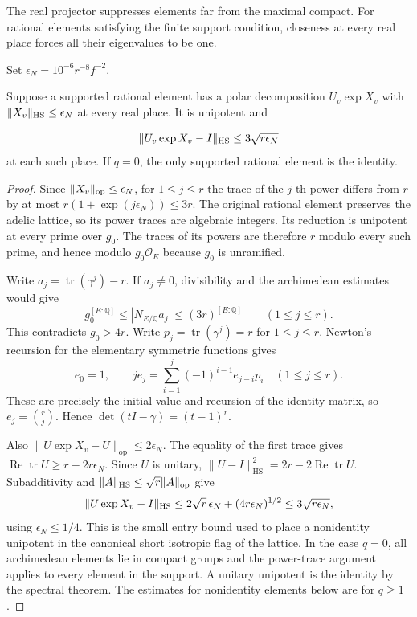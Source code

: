 The real projector suppresses elements far from the maximal compact. For rational elements satisfying the finite support condition, closeness at every real place forces all their eigenvalues to be one.

Set \(\epsilon_N=10^{-6}r^{-8}f^{-2}\).
\begin{lemma}\label{lem:small-unipotent}
Suppose a supported rational element has a polar decomposition
\(U_v\exp X_v\) with \(\|X_v\|_{\rm HS}\le\epsilon_N\) at every
real place. It is unipotent and

\[
 \|U_v\exp X_v-I\|_{\rm HS}\le3\sqrt{r\epsilon_N}
\]
 at each such
place. If \(q=0\), the only supported rational element is the identity.
\end{lemma}

\begin{proof}
Since \(\|X_v\|_{\rm op}\le\epsilon_N\), for
\(1\le j\le r\) the trace of the \(j\)-th power differs from
\(r\) by at most \(r(1+\exp(j\epsilon_N))\le3r\).
The original rational element preserves the adelic lattice,
so its power traces are algebraic integers. Its reduction is
unipotent at every prime over \(g_0\). The traces of its powers
are therefore \(r\) modulo every such prime, and hence
modulo \(g_0\mathcal O_E\) because \(g_0\) is unramified.

Write \(a_j=\operatorname{tr}(\gamma^j)-r\).
If \(a_j\ne0\), divisibility and the archimedean estimates would give
\[
    g_0^{[E:\mathbb Q]}\le |N_{E/\mathbb Q}a_j|\le
        (3r)^{[E:\mathbb Q]}\qquad(1\le j\le r).
\]
This contradicts \(g_0>4r\).
Write \(p_j=\operatorname{tr}(\gamma^j)=r\) for \(1\le j\le r\).
Newton's recursion for the elementary symmetric functions gives
\[
 e_0=1,\qquad j e_j=\sum_{i=1}^j(-1)^{i-1} e_{j-i}p_i
      \quad(1\le j\le r).
\]
These are precisely the initial value and recursion of the identity
matrix, so \(e_j=\binom rj\). Hence \(\det(tI-\gamma)=(t-1)^r\).

Also \(\|U\exp X_v-U\|_{\mathrm{op}}\le2\epsilon_N\).
The equality of the first trace gives
\(\operatorname{Re}\operatorname{tr}U\ge r-2r\epsilon_N\).
Since \(U\) is unitary,
\(\|U-I\|_{\mathrm{HS}}^2=2r-2\operatorname{Re}\operatorname{tr}U\).
Subadditivity and \(\|A\|_{\rm HS}\le\sqrt r\|A\|_{\rm op}\) give
\[
 \|U\exp X_v-I\|_{\rm HS}
 \le 2\sqrt r\,\epsilon_N + (4r\epsilon_N)^{1/2}
 \le 3\sqrt{r\epsilon_N},
\]
using \(\epsilon_N\le1/4\).
This is the small entry bound used to place a nonidentity
unipotent in the canonical short isotropic flag of the lattice.
In the case \(q=0\), all archimedean elements lie in compact
groups and the power-trace argument applies to every element
in the support. A unitary unipotent is the identity by the
spectral theorem. The estimates for nonidentity elements below
are for \(q\ge1\).
\end{proof}


